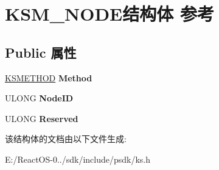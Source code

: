 \hypertarget{struct_k_s_m___n_o_d_e}{}\section{K\+S\+M\+\_\+\+N\+O\+D\+E结构体 参考}
\label{struct_k_s_m___n_o_d_e}
\subsection*{Public 属性}
\begin{DoxyCompactItemize}
\item 
\mbox{\label{struct_k_s_m___n_o_d_e_a82d0631a7e94855367966d684ad7df16}} 
\hyperlink{struct_k_s_i_d_e_n_t_i_f_i_e_r}{K\+S\+M\+E\+T\+H\+OD} {\bfseries Method}
\item 
\mbox{\label{struct_k_s_m___n_o_d_e_ad0959d4bb46e730b3500518a29e95724}} 
U\+L\+O\+NG {\bfseries Node\+ID}
\item 
\mbox{\label{struct_k_s_m___n_o_d_e_ae9a6d3699f348593bc319372ca98e79f}} 
U\+L\+O\+NG {\bfseries Reserved}
\end{DoxyCompactItemize}


该结构体的文档由以下文件生成\+:\begin{DoxyCompactItemize}
\item 
E\+:/\+React\+O\+S-\/0../sdk/include/psdk/ks.\+h\end{DoxyCompactItemize}
